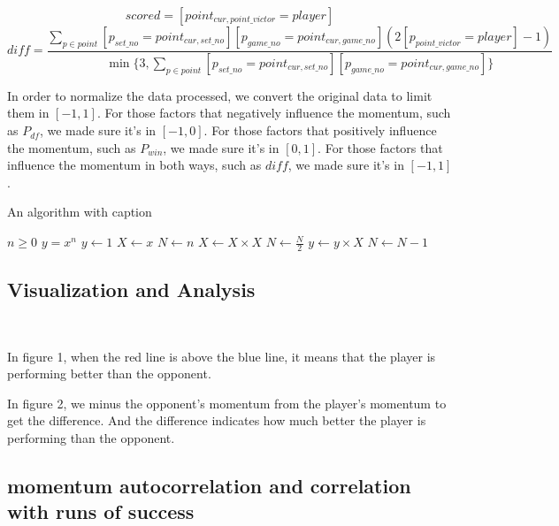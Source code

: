 \begin{equation}
    scored = [point_{cur, point\_victor} = player]
\end{equation}
\begin{equation}
    diff = \frac{\sum_{p \in point}[p_{set\_no} = point_{cur, set\_no}][p_{game\_no} = point_{cur, game\_no}](2[p_{point\_victor} = player]-1)}{\min\{3, \sum_{p \in point}[p_{set\_no} = point_{cur, set\_no}][p_{game\_no} = point_{cur, game\_no}]\}}
\end{equation}
\par In order to normalize the data processed, we convert the original data to limit them in $[-1, 1]$. For those factors that negatively influence the momentum, such as $P_{df}$, we made sure it's in $[-1, 0]$. For those factors that positively influence the momentum, such as $P_{win}$, we made sure it's in $[0, 1]$. For those factors that influence the momentum in both ways, such as $diff$, we made sure it's in $[-1, 1]$.

\begin{algorithm}
    \caption{An algorithm with caption}\label{alg:cap}
    \begin{algorithmic}
    \Require $n \geq 0$
    \Ensure $y = x^n$
    \State $y \gets 1$
    \State $X \gets x$
    \State $N \gets n$
        \State $X \gets X \times X$
        \State $N \gets \frac{N}{2}$  
        \State $y \gets y \times X$
        \State $N \gets N - 1$
    \EndIf
    \EndWhile
    \end{algorithmic}
\end{algorithm}

\subsection{Visualization and Analysis}~{}

In figure 1, when the red line is above the blue line, it means that the player is performing better than the opponent. 

In figure 2, we minus the opponent's momentum from the player's momentum to get the difference. And the difference 
indicates how much better the player is performing than the opponent.

\subsection{momentum autocorrelation and correlation with runs of success}~{}

